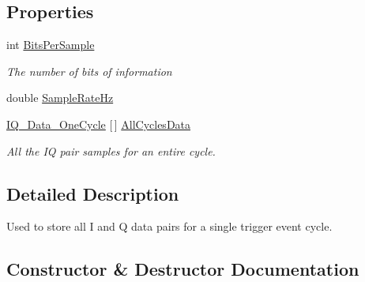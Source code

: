 \subsection*{Properties}
\begin{DoxyCompactItemize}
\item 
int \mbox{\hyperlink{class_c_s_i_1_1_library_1_1_signal_processing_1_1_r_f_1_1_i_q___processing_1_1_i_q___data___all_cycles_ab8696a0f5087a52316c29b7ed897623d}{Bits\+Per\+Sample}}
\begin{DoxyCompactList}\small\item\em The number of bits of information \end{DoxyCompactList}\item 
double \mbox{\hyperlink{class_c_s_i_1_1_library_1_1_signal_processing_1_1_r_f_1_1_i_q___processing_1_1_i_q___data___all_cycles_aba8400c2b61c633d2f35d212ad22b978}{Sample\+Rate\+Hz}}
\item 
\mbox{\hyperlink{class_c_s_i_1_1_library_1_1_signal_processing_1_1_r_f_1_1_i_q___processing_1_1_i_q___data___one_cycle}{I\+Q\+\_\+\+Data\+\_\+\+One\+Cycle}} \mbox{[}$\,$\mbox{]} \mbox{\hyperlink{class_c_s_i_1_1_library_1_1_signal_processing_1_1_r_f_1_1_i_q___processing_1_1_i_q___data___all_cycles_ab6728a596fab2195edf578694114834f}{All\+Cycles\+Data}}
\begin{DoxyCompactList}\small\item\em All the IQ pair samples for an entire cycle. \end{DoxyCompactList}\end{DoxyCompactItemize}


\subsection{Detailed Description}
Used to store all I and Q data pairs for a single trigger event cycle. 



\subsection{Constructor \& Destructor Documentation}
\mbox{\label{class_c_s_i_1_1_library_1_1_signal_processing_1_1_r_f_1_1_i_q___processing_1_1_i_q___data___all_cycles_a8f408e8ef6c36c9a96a1ae949dc9a83e}} 
